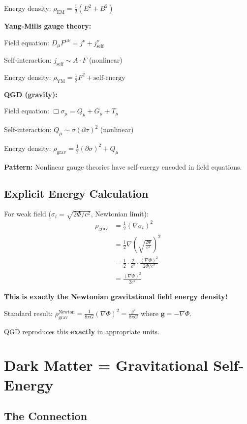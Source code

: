 \documentclass[11pt,a4paper]{article}
\theoremstyle{definition}
\theoremstyle{remark}
\begin{document}
	Energy density: $\rho_{\text{EM}} = \frac{1}{2}(E^2 + B^2)$
	
	\textbf{Yang-Mills gauge theory:}
	
	Field equation: $D_\mu F^{\mu\nu} = j^\nu + j_{\text{self}}^\nu$
	
	Self-interaction: $j_{\text{self}} \sim A \cdot F$ (nonlinear)
	
	Energy density: $\rho_{\text{YM}} = \frac{1}{2}F^2 + \text{self-energy}$
	
	\textbf{QGD (gravity):}
	
	Field equation: $\Box\sigma_\mu = Q_\mu + G_\mu + T_\mu$
	
	Self-interaction: $Q_\mu \sim \sigma(\partial\sigma)^2$ (nonlinear)
	
	Energy density: $\rho_{\text{grav}} = \frac{1}{2}(\partial\sigma)^2 + Q_\mu$
	
	\textbf{Pattern:} Nonlinear gauge theories have self-energy encoded in field equations.
	
	\subsection{Explicit Energy Calculation}
	
	For weak field ($\sigma_t = \sqrt{2\Phi/c^2}$, Newtonian limit):
	\begin{align}
		\rho_{\text{grav}} &= \frac{1}{2}(\nabla\sigma_t)^2\\
		&= \frac{1}{2}\nabla\left(\sqrt{\frac{2\Phi}{c^2}}\right)^2\\
		&= \frac{1}{2} \cdot \frac{2}{c^2} \cdot \frac{(\nabla\Phi)^2}{2\Phi/c^2}\\
		&= \frac{(\nabla\Phi)^2}{2c^2}
	\end{align}
	
	\textbf{This is exactly the Newtonian gravitational field energy density!}
	
	Standard result: $\rho_{\text{grav}}^{\text{Newton}} = \frac{1}{8\pi G}(\nabla\Phi)^2 = \frac{g^2}{8\pi G}$ where $\mathbf{g} = -\nabla\Phi$.
	
	QGD reproduces this \textbf{exactly} in appropriate units.
	
	\section{Dark Matter = Gravitational Self-Energy}
	
	\subsection{The Connection}
	
\end{document}
